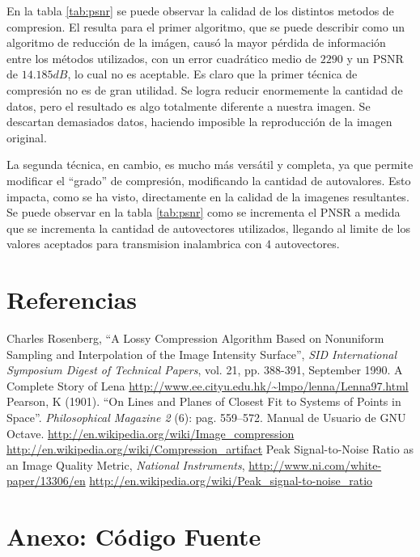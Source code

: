 \documentclass[twocolumn,a4paper,10pt]{article}
\begin{document}
En la tabla \ref{tab:psnr} se puede observar la calidad de los distintos metodos de compresion.
El resulta para el primer algoritmo, que se puede describir como un algoritmo de reducción de la imágen, causó la mayor pérdida de información entre los métodos utilizados, con un error cuadrático medio de $2290$ y un PSNR de $14.185 dB$, lo cual no es aceptable.
Es claro que la primer t\'ecnica de compresi\'on no es de gran utilidad. Se logra reducir enormemente la cantidad de datos, pero el resultado es algo
totalmente diferente a nuestra imagen. Se descartan demasiados datos, haciendo imposible la reproducci\'on de la imagen original.

La segunda t\'ecnica, en cambio, es mucho m\'as vers\'atil y completa, ya que permite modificar el ``grado'' de compresi\'on, modificando la cantidad de autovalores. 
Esto impacta, como se ha visto, directamente en la calidad de la imagenes resultantes.
Se puede observar en la tabla \ref{tab:psnr} como se incrementa el PNSR a medida que se incrementa la cantidad de autovectores utilizados, llegando al limite de los valores aceptados para transmision inalambrica con 4 autovectores.

\section*{Referencias}
\begin{thebibliography}{99}
    
    Charles Rosenberg, ``A Lossy Compression Algorithm Based on Nonuniform Sampling and Interpolation of the Image Intensity Surface'', \textit{SID International Symposium Digest of Technical Papers}, vol. 21, pp. 388-391, September 1990.
    A Complete Story of Lena \url{http://www.ee.cityu.edu.hk/~lmpo/lenna/Lenna97.html}
     Pearson, K (1901). ``On Lines and Planes of Closest Fit to Systems of Points in Space''. \textit{Philosophical Magazine 2} (6): pag. 559–572.
     Manual de Usuario de GNU Octave.
     \url{http://en.wikipedia.org/wiki/Image\_compression}
     \url{http://en.wikipedia.org/wiki/Compression\_artifact}
     Peak Signal-to-Noise Ratio as an Image Quality Metric, \textit{National Instruments}, \url{http://www.ni.com/white-paper/13306/en}
     \url{http://en.wikipedia.org/wiki/Peak_signal-to-noise_ratio}

\end{thebibliography}

\newpage
\section*{Anexo: Código Fuente}
    
    
    
\end{document}

